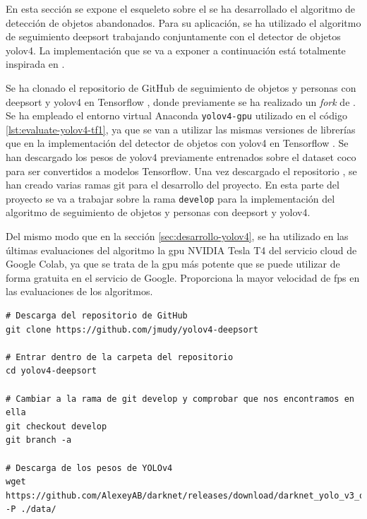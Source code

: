 En esta sección se expone el esqueleto sobre el se ha desarrollado el algoritmo de detección de objetos abandonados. Para su aplicación, se ha utilizado el algoritmo de seguimiento \gls{deepsort} trabajando conjuntamente con el detector de objetos \gls{yolov4}. La implementación que se va a exponer a continuación está totalmente inspirada en \cite{yolov4-deepsort-original}.

Se ha clonado el repositorio de GitHub de seguimiento de objetos y personas con \gls{deepsort} y \gls{yolov4} en Tensorflow \cite{yolov4-deepsort}, donde previamente se ha realizado un \textit{fork} de \cite{yolov4-deepsort-original}. Se ha empleado el entorno virtual Anaconda \texttt{yolov4-gpu} utilizado en el código \ref{lst:evaluate-yolov4-tf1}, ya que se van a utilizar las mismas versiones de librerías que en la implementación del detector de objetos con \gls{yolov4} en Tensorflow \cite{yolov4-tf-github}. Se han descargado los pesos de \gls{yolov4} previamente entrenados sobre el dataset \gls{coco} para ser convertidos a modelos Tensorflow. Una vez descargado el repositorio \cite{yolov4-deepsort}, se han creado varias ramas git para el desarrollo del proyecto. En esta parte del proyecto se va a trabajar sobre la rama \texttt{develop} para la implementación del algoritmo de seguimiento de objetos y personas con \gls{deepsort} y \gls{yolov4}.

Del mismo modo que en la sección \ref{sec:desarrollo-yolov4}, se ha utilizado en las últimas evaluaciones del algoritmo la \gls{gpu} NVIDIA Tesla T4 del servicio cloud de Google Colab, ya que se trata de la \gls{gpu} más potente que se puede utilizar de forma gratuita en el servicio de Google. Proporciona la mayor velocidad de \gls{fps} en las evaluaciones de los algoritmos.

\vspace{0.5cm}
\begin{lstlisting}[language=iPython,caption=Evaluación del seguimiento de objetos Deep SORT y YOLOv4 en Tensorflow (1),captionpos=b,label={lst:evaluate-deepsort-tf1}]
# Descarga del repositorio de GitHub
git clone https://github.com/jmudy/yolov4-deepsort

# Entrar dentro de la carpeta del repositorio
cd yolov4-deepsort

# Cambiar a la rama de git develop y comprobar que nos encontramos en ella
git checkout develop
git branch -a

# Descarga de los pesos de YOLOv4
wget https://github.com/AlexeyAB/darknet/releases/download/darknet_yolo_v3_optimal/yolov4.weights -P ./data/
\end{lstlisting}

